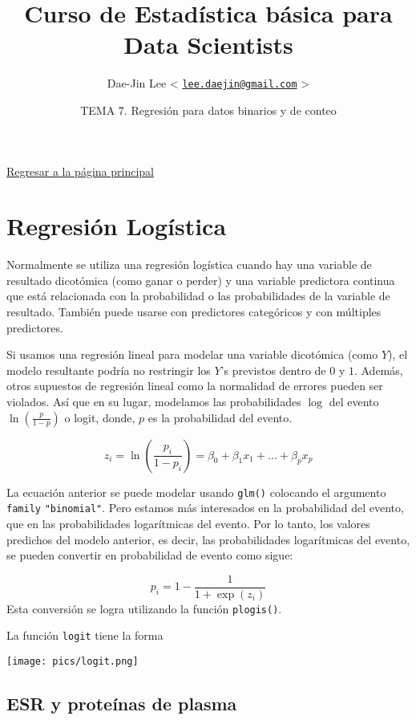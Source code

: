 \documentclass[]{article}
\title{\textbf{Curso de Estadística básica para Data Scientists}}
\author{Dae-Jin Lee \textless{}
\href{mailto:lee.daejin@gmail.com}{\nolinkurl{lee.daejin@gmail.com}}
\textgreater{}}
\date{TEMA 7. Regresión para datos binarios y de conteo}
\numberwithin{equation}{section}
\begin{document}
\maketitle

{
\hypersetup{linkcolor=black}
\setcounter{tocdepth}{2}
\tableofcontents
}
\newpage

\href{https://idaejin.github.io/bcam-courses/R/datahack/}{Regresar a la
página principal}

\section{Regresión Logística}\label{regresion-logistica}

Normalmente se utiliza una regresión logística cuando hay una variable
de resultado dicotómica (como ganar o perder) y una variable predictora
continua que está relacionada con la probabilidad o las probabilidades
de la variable de resultado. También puede usarse con predictores
categóricos y con múltiples predictores.

Si usamos una regresión lineal para modelar una variable dicotómica
(como \(Y\)), el modelo resultante podría no restringir los \(Y\)'s
previstos dentro de \(0\) y \(1\). Además, otros supuestos de regresión
lineal como la normalidad de errores pueden ser violados. Así que en su
lugar, modelamos las probabilidades \(\log\) del evento
\(\ln (\frac{p}{1-p})\) o logit, donde, \(p\) es la probabilidad del
evento.

\[
    z_i = \ln (\frac{p_i}{1-p_i}) =   \beta_0 + \beta_1 x_1 + ... + \beta_p x_p
\]

La ecuación anterior se puede modelar usando \texttt{glm()} colocando el
argumento \texttt{family} \texttt{"binomial"}. Pero estamos más
interesados en la probabilidad del evento, que en las probabilidades
logarítmicas del evento. Por lo tanto, los valores predichos del modelo
anterior, es decir, las probabilidades logarítmicas del evento, se
pueden convertir en probabilidad de evento como sigue:

\[
  p_i = 1- \frac{1}{1 + \exp(z_i)}
\] Esta conversión se logra utilizando la función \texttt{plogis()}.

La función \texttt{logit} tiene la forma

\texttt{[image: pics/logit.png]}

\subsection{ESR y proteínas de plasma}\label{esr-y-proteinas-de-plasma}
\end{document}
